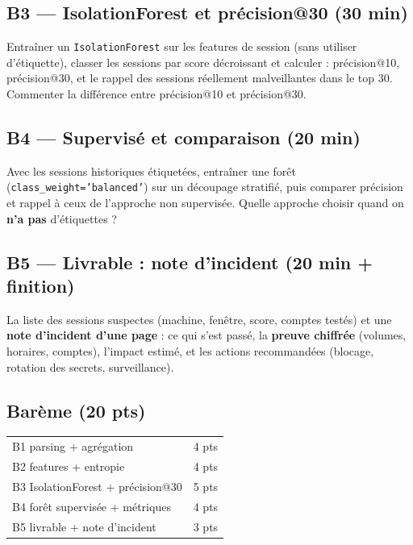 \documentclass[11pt,a4paper]{article}
\newcommand{\py}[1]{\texttt{\small #1}}
\begin{document}
\subsection*{B3 --- IsolationForest et précision@30 (30 min)}
Entraîner un \py{IsolationForest} sur les features de session (sans utiliser
d'étiquette), classer les sessions par score décroissant et calculer :
précision@10, précision@30, et le rappel des sessions réellement malveillantes
dans le top 30. Commenter la différence entre précision@10 et précision@30.

\subsection*{B4 --- Supervisé et comparaison (20 min)}
Avec les sessions historiques étiquetées, entraîner une forêt
(\py{class\_weight='balanced'}) sur un découpage stratifié, puis comparer
précision et rappel à ceux de l'approche non supervisée. Quelle approche
choisir quand on \textbf{n'a pas} d'étiquettes ?

\subsection*{B5 --- Livrable : note d'incident (20 min + finition)}
\begin{rendre}
La liste des sessions suspectes (machine, fenêtre, score, comptes testés) et
une \textbf{note d'incident d'une page} : ce qui s'est passé, la \textbf{preuve
chiffrée} (volumes, horaires, comptes), l'impact estimé, et les actions
recommandées (blocage, rotation des secrets, surveillance).
\end{rendre}

\subsection*{Barème (20 pts)}
\begin{center}\small
\begin{tabular}{@{}p{11.2cm}c@{}}
\toprule
B1 parsing + agrégation & 4 pts\\
B2 features + entropie & 4 pts\\
B3 IsolationForest + précision@30 & 5 pts\\
B4 forêt supervisée + métriques & 4 pts\\
B5 livrable + note d'incident & 3 pts\\
\bottomrule
\end{tabular}
\end{center}
\end{document}
